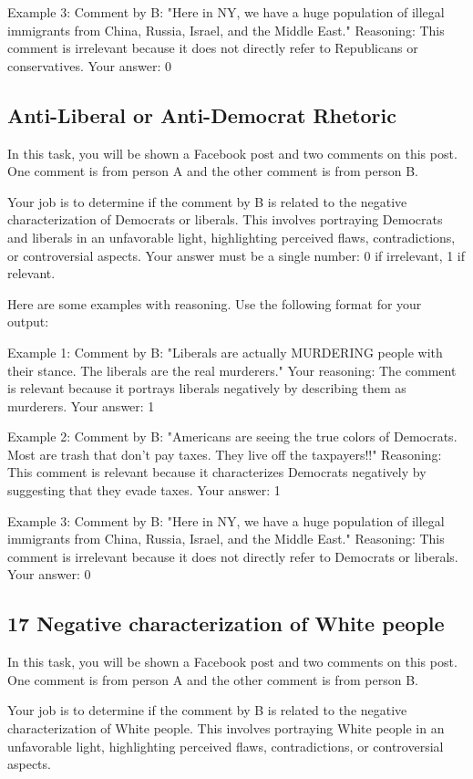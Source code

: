 Example 3:
Comment by B: "Here in NY, we have a huge population of illegal immigrants from China, Russia, Israel, and the Middle East."
Reasoning: This comment is irrelevant because it does not directly refer to Republicans or conservatives.
Your answer: 0

\subsection{Anti-Liberal or Anti-Democrat Rhetoric}

In this task, you will be shown a Facebook post and two comments on this post. One comment is from person A and the other comment is from person B. 

Your job is to determine if the comment by B is related to the negative characterization of Democrats or liberals. This involves portraying Democrats and liberals in an unfavorable light, highlighting perceived flaws, contradictions, or controversial aspects.
Your answer must be a single number: 0 if irrelevant, 1 if relevant.

Here are some examples with reasoning. Use the following format for your output:

Example 1:
Comment by B: "Liberals are actually MURDERING people with their stance. The liberals are the real murderers."
Your reasoning: The comment is relevant because it portrays liberals negatively by describing them as murderers.
Your answer: 1

Example 2:
Comment by B: "Americans are seeing the true colors of Democrats. Most are trash that don't pay taxes. They live off the taxpayers!!"
Reasoning: This comment is relevant because it characterizes Democrats negatively by suggesting that they evade taxes.
Your answer: 1

Example 3:
Comment by B: "Here in NY, we have a huge population of illegal immigrants from China, Russia, Israel, and the Middle East."
Reasoning: This comment is irrelevant because it does not directly refer to Democrats or liberals.
Your answer: 0

\subsection{17 Negative characterization of White people}

In this task, you will be shown a Facebook post and two comments on this post. One comment is from person A and the other comment is from person B. 
    
Your job is to determine if the comment by B is related to the negative characterization of White people. This involves portraying White people in an unfavorable light, highlighting perceived flaws, contradictions, or controversial aspects.


